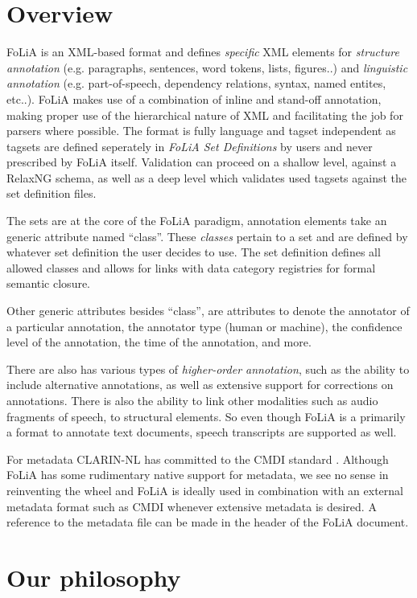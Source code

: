 \documentclass[a4paper,11pt]{article}
\begin{document}
\section{Overview}
\label{sec:overview}

FoLiA is an XML-based format and defines \emph{specific} XML elements for \emph{structure
annotation} (e.g. paragraphs, sentences, word tokens, lists, figures..) and
\emph{linguistic annotation} (e.g. part-of-speech, dependency relations,
syntax, named entites, etc..). FoLiA makes use of a combination of inline and
stand-off annotation, making proper use of the hierarchical nature of XML and
facilitating the job for parsers where possible. The format is fully language and
tagset independent as tagsets are defined seperately in \emph{FoLiA Set Definitions}
by users and never prescribed by FoLiA itself. Validation can proceed
on a shallow level, against a RelaxNG schema, as well as a deep level which
validates used tagsets against the set definition files.

The sets are at the core of the FoLiA paradigm, annotation elements take an
generic attribute named ``class''. These \emph{classes} pertain to a set and are
defined by whatever set definition the user decides to use. The set definition
defines all allowed classes and allows for links with data category registries
for formal semantic closure.

Other generic attributes besides ``class'', are attributes to denote the
annotator of a particular annotation, the annotator type (human or machine),
the confidence level of the annotation, the time of the annotation, and more.

There are also has various types of \emph{higher-order annotation}, such as
the ability to include alternative annotations, as well as extensive support
for corrections on annotations. There is also the ability to link other
modalities such as audio fragments of speech, to structural elements. So even
though FoLiA is a primarily a format to annotate text documents, speech
transcripts are supported as well. 

For metadata CLARIN-NL has committed to the CMDI standard \cite{CMDI}.
Although FoLiA has some rudimentary native support for metadata, we see no
sense in reinventing the wheel and FoLiA is ideally used in combination with an
external metadata format such as CMDI whenever extensive metadata is desired. A
reference to the metadata file can be made in the header of the FoLiA document.

\section{Our philosophy}
\end{document}
